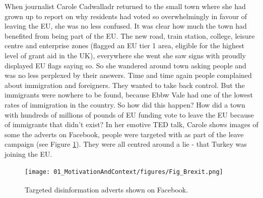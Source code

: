 When journalist Carole Cadwalladr returned to the small town where she had grown up to report on why residents had voted so overwhelmingly in favour of leaving the EU, she was no less confused. It was clear how much the town had benefited from being part of the EU. The new road, train station, college, leisure centre and enterprise zones (flagged an EU tier 1 area, eligible for the highest level of grant aid in the UK), everywhere she went she saw signs with proudly displayed EU flags saying so. So she wandered around town asking people and was no less perplexed by their answers. Time and time again people complained about immigration and foreigners. They wanted to take back control. But the immigrants were nowhere to be found, because Ebbw Vale had one of the lowest rates of immigration in the country. So how did this happen? How did a town with hundreds of millions of pounds of EU funding vote to leave the EU because of immigrants that didn't exist? In her emotive TED talk\cite{CarCadTED}, Carole shows images of some the adverts on Facebook, people were targeted with as part of the leave campaign (see Figure \ref{fig_Brexit}). They were all centred around a lie - that Turkey was joining the EU.
%
\begin{figure}[h!]
\centering
\texttt{[image: 01\_MotivationAndContext/figures/Fig\_Brexit.png]}
\caption[Targeted disinformation adverts shown on Facebook.]{Targeted disinformation adverts shown on Facebook\textsuperscript{\cite{CarCadTED}}.}
\label{fig_Brexit}
\end{figure}

